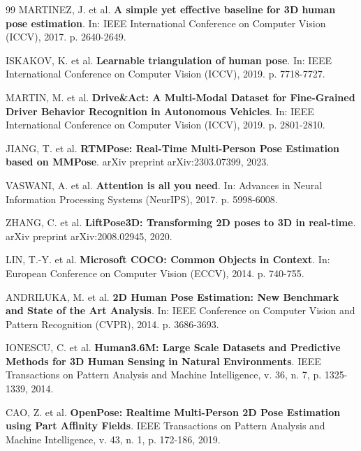 \documentclass[12pt, a4paper]{article}
\begin{document}
\begin{thebibliography}{99}
    MARTINEZ, J. et al. \textbf{A simple yet effective baseline for 3D human pose estimation}. In: IEEE International Conference on Computer Vision (ICCV), 2017. p. 2640-2649.

    ISKAKOV, K. et al. \textbf{Learnable triangulation of human pose}. In: IEEE International Conference on Computer Vision (ICCV), 2019. p. 7718-7727.

    MARTIN, M. et al. \textbf{Drive\&Act: A Multi-Modal Dataset for Fine-Grained Driver Behavior Recognition in Autonomous Vehicles}. In: IEEE International Conference on Computer Vision (ICCV), 2019. p. 2801-2810.

    JIANG, T. et al. \textbf{RTMPose: Real-Time Multi-Person Pose Estimation based on MMPose}. arXiv preprint arXiv:2303.07399, 2023.

    VASWANI, A. et al. \textbf{Attention is all you need}. In: Advances in Neural Information Processing Systems (NeurIPS), 2017. p. 5998-6008.

    ZHANG, C. et al. \textbf{LiftPose3D: Transforming 2D poses to 3D in real-time}. arXiv preprint arXiv:2008.02945, 2020.

    LIN, T.-Y. et al. \textbf{Microsoft COCO: Common Objects in Context}. In: European Conference on Computer Vision (ECCV), 2014. p. 740-755.

    ANDRILUKA, M. et al. \textbf{2D Human Pose Estimation: New Benchmark and State of the Art Analysis}. In: IEEE Conference on Computer Vision and Pattern Recognition (CVPR), 2014. p. 3686-3693.

    IONESCU, C. et al. \textbf{Human3.6M: Large Scale Datasets and Predictive Methods for 3D Human Sensing in Natural Environments}. IEEE Transactions on Pattern Analysis and Machine Intelligence, v. 36, n. 7, p. 1325-1339, 2014.

    CAO, Z. et al. \textbf{OpenPose: Realtime Multi-Person 2D Pose Estimation using Part Affinity Fields}. IEEE Transactions on Pattern Analysis and Machine Intelligence, v. 43, n. 1, p. 172-186, 2019.
\end{thebibliography}
\end{document}
